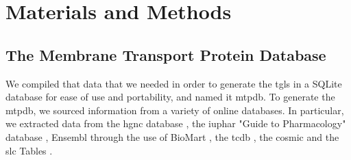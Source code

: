 \section{Materials and Methods}

\subsection{The Membrane Transport Protein Database}
We compiled that data that we needed in order to generate the \glspl{tgl} in a SQLite database for ease of use and portability, and named it \gls{mtpdb}. To generate the \gls{mtpdb}, we sourced information from a variety of online databases. In particular, we extracted data from the \gls{hgnc} database \cite{sealGenenamesOrgHGNC2023}, the \gls{iuphar} "Guide to Pharmacology" database \cite{hardingIUPHARBPSGuide2022}, Ensembl \cite{cunninghamEnsembl20222022} through the use of BioMart \cite{smedleyBioMartBiologicalQueries2009}, the \gls{tcdb} \cite{saierTransporterClassificationDatabase2021}, the \gls{cosmic} \cite{tateCOSMICCatalogueSomatic2019} and the \gls{slc} Tables \cite{hedigerABCsMembraneTransporters2013}.

